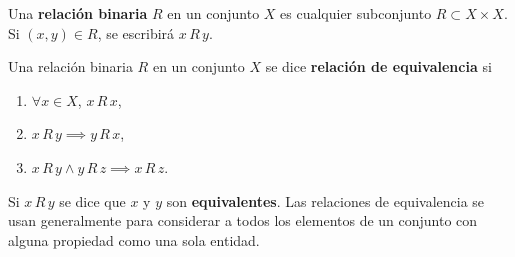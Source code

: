 

\begin{definition}
Una \textbf{relación binaria} $R$ en un conjunto $X$ es cualquier subconjunto $R \subset X \times X$. Si $(x,y) \in R$, se escribirá $x \, R \, y$.
\end{definition}

\begin{definition}
Una relación binaria $R$ en un conjunto $X$ se dice \textbf{relación de equivalencia} si
\begin{enumerate}[label=\textnormal{(\roman*)}]
\item $\forall x \in X$, $x \, R \, x$,
\item $x \, R \, y \implies y \, R \, x$,
\item $x \, R \, y \land y \, R \, z \implies x \, R \, z$.
\end{enumerate}
Si $x \, R \, y$ se dice que $x$ y $y$ son \textbf{equivalentes}. Las relaciones de equivalencia se usan generalmente para considerar a todos los elementos de un conjunto con alguna propiedad como una sola entidad.
\end{definition}
